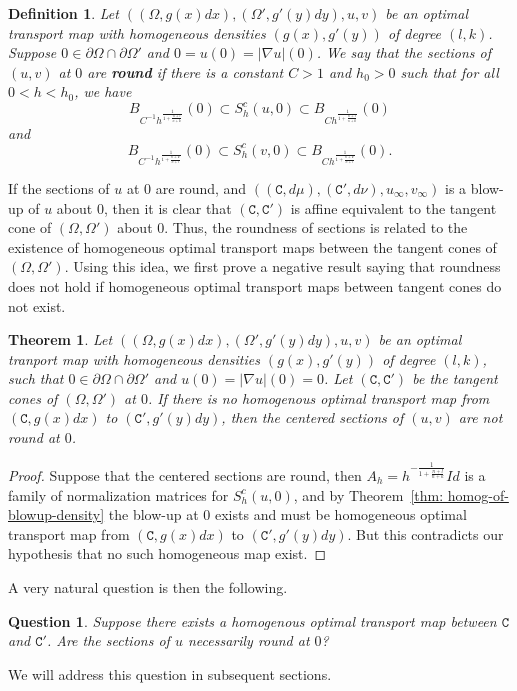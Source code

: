 \documentclass[12pt,reqno]{amsart}
\newtheorem{ques}{Question}
\newtheorem{defn}{Definition}[section]
\newtheorem{theorem}{Theorem}[section]
\numberwithin{equation}{section}
\begin{document}
        \begin{defn}\label{def: round}
            Let $((\Omega, g(x)dx), (\Omega', g'(y)dy), u, v)$ be an optimal transport map with homogeneous densities $(g(x), g'(y))$ of degree $(l, k)$. Suppose $0\in\partial\Omega\cap\partial\Omega'$ and $0 = u(0)=|\nabla u|(0)$. We say that the sections of $(u, v)$ at $0$ are {\bf round} if there is a constant $C>1$ and $h_0>0$ such that for all $0<h<h_0$, we have
            \[B_{C^{-1}h^{\frac{1}{1+\frac{n+l}{n+k}}}}(0)\subset S^c_h(u, 0)\subset  B_{Ch^{\frac{1}{1+\frac{n+l}{n+k}}}}(0)\]
            and
            \[B_{C^{-1}h^{\frac{1}{1+\frac{n+k}{n+l}}}}(0)\subset S^c_h(v, 0)\subset  B_{Ch^{\frac{1}{1+\frac{n+k}{n+l}}}}(0).\]
        \end{defn}
        If the sections of $u$ at $0$ are round, and $((\mathtt C, d\mu), (\mathtt C', d\nu), u_{\infty}, v_{\infty})$ is a blow-up of $u$ about $0$, then it is clear that $(\mathtt C, \mathtt C')$ is affine equivalent to the tangent cone of $(\Omega, \Omega')$ about $0$. Thus, the roundness of sections is related to the existence of homogeneous optimal transport maps between the tangent cones of $(\Omega, \Omega')$. Using this idea, we first prove a negative result saying that roundness does not hold if homogeneous optimal transport maps between tangent cones do not exist. 
        \begin{theorem}\label{thm: non-round}
            Let $((\Omega, g(x)dx), (\Omega', g'(y)dy), u, v)$ be an optimal tranport map with homogeneous densities $(g(x), g'(y))$ of degree $(l, k)$, such that $0\in \partial\Omega\cap\partial\Omega'$ and $u(0) = |\nabla u|(0) = 0$. Let $(\mathtt C, \mathtt C')$ be the tangent cones of $(\Omega, \Omega')$ at $0$. If there is no homogenous optimal transport map from $(\mathtt C, g(x)dx)$ to $(\mathtt C', g'(y)dy)$, then the centered sections of $(u, v)$ are not round at $0$. 
        \end{theorem}
        \begin{proof}
            Suppose that the centered sections are round, then $A_h= h^{-\frac{1}{1+\frac{n+l}{n+k}}}Id$ is a family of normalization matrices for $S_h^c(u, 0)$, and by Theorem~\ref{thm: homog-of-blowup-density} the blow-up at $0$ exists and must be homogeneous optimal transport map from $(\mathtt C, g(x)dx)$ to $(\mathtt C', g'(y)dy)$. But this contradicts our hypothesis that no such homogeneous map exist. 
        \end{proof}

        A very natural question is then the following. 
        \begin{ques}\label{ques: roundness}
            Suppose there exists a homogenous optimal transport map between $\mathtt C$ and $\mathtt C'$. Are the sections of $u$ necessarily round at $0$?
        \end{ques}
        We will address this question in subsequent sections. 
\end{document}
